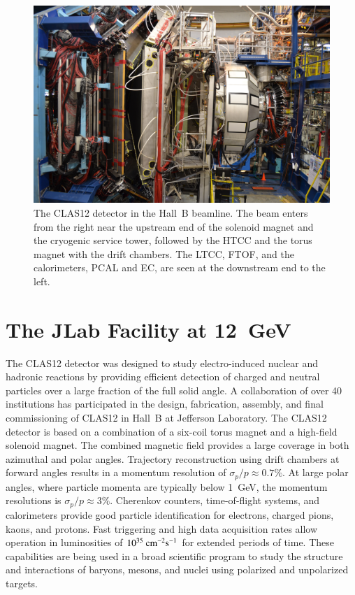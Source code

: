 \documentclass[final,3p,twocolumn]{elsarticle}
\begin{document}
\begin{figure}[bhtp!]
\centerline{\includegraphics[width=1.4\columnwidth]{CLAS12_photo-1.jpg}}
\caption{The CLAS12 detector in the Hall~B beamline. The beam enters from the right near the upstream end of
  the solenoid magnet and the cryogenic service tower, followed by the HTCC and the torus magnet with the drift
  chambers. The LTCC, FTOF, and the calorimeters, PCAL and EC, are seen at the downstream end to the left.}
\label{clas12-photo}
\end{figure}

\section{The JLab Facility at 12~GeV}
\label{jlab}

The CLAS12 detector was designed to study electro-induced nuclear and hadronic reactions by providing efficient
detection of charged and neutral particles over a large fraction of the full solid angle. A collaboration of over 40
institutions has participated in the design, fabrication, assembly, and final commissioning of CLAS12 in Hall~B at 
Jefferson Laboratory. The CLAS12 detector is based on a combination of a six-coil torus magnet and a high-field
solenoid magnet. The combined magnetic field provides a large coverage in both azimuthal and polar angles.
Trajectory reconstruction using drift chambers at forward angles results in a momentum resolution of
${\sigma_p / p} \approx 0.7\%$. At large polar angles, where particle momenta are typically below 1~GeV, the 
momentum resolutions is $\sigma_p / p \approx 3\%$. Cherenkov counters, time-of-flight systems, and
calorimeters provide good particle identification for electrons, charged pions, kaons, and protons. Fast triggering
and high data acquisition rates allow operation in luminosities of $10^{35}~\rm{cm}^{-2}\rm{s}^{-1}$ for extended
periods of time. These capabilities are being used in a broad scientific program to study the structure and
interactions of baryons, mesons, and nuclei using polarized and unpolarized targets. 
\end{document}
